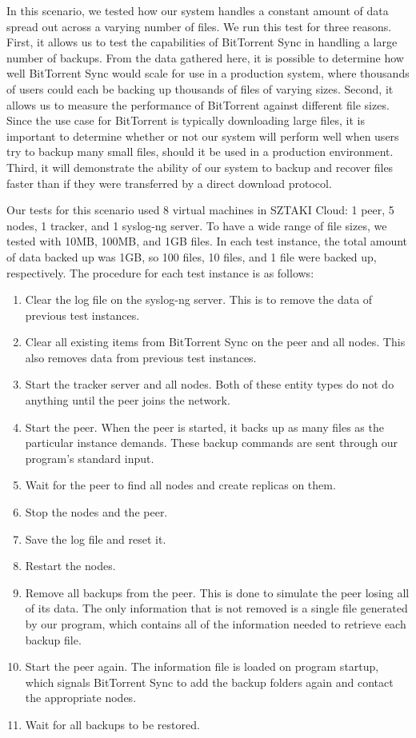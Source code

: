 \documentclass[12pt]{report}
\begin{document}
In this scenario, we tested how our system handles a constant amount of data spread out across a varying number of files. We run this test for three reasons. First, it allows us to test the capabilities of BitTorrent Sync in handling a large number of backups. From the data gathered here, it is possible to determine how well BitTorrent Sync would scale for use in a production system, where thousands of users could each be backing up thousands of files of varying sizes. Second, it allows us to measure the performance of BitTorrent against different file sizes. Since the use case for BitTorrent is typically downloading large files, it is important to determine whether or not our system will perform well when users try to backup many small files, should it be used in a production environment. Third, it will demonstrate the ability of our system to backup and recover files faster than if they were transferred by a direct download protocol.

Our tests for this scenario used 8 virtual machines in SZTAKI Cloud: 1 peer, 5 nodes, 1 tracker, and 1 syslog-ng server. To have a wide range of file sizes, we tested with 10MB, 100MB, and 1GB files. In each test instance, the total amount of data backed up was 1GB, so 100 files, 10 files, and 1 file were backed up, respectively. The procedure for each test instance is as follows:

\begin{enumerate}
  \item Clear the log file on the syslog-ng server. This is to remove the data of previous test instances.
  \item Clear all existing items from BitTorrent Sync on the peer and all nodes. This also removes data from previous test instances.
  \item Start the tracker server and all nodes. Both of these entity types do not do anything until the peer joins the network.
  \item Start the peer. When the peer is started, it backs up as many files as the particular instance demands. These backup commands are sent through our program's standard input.
  \item Wait for the peer to find all nodes and create replicas on them.
  \item Stop the nodes and the peer.
  \item Save the log file and reset it.
  \item Restart the nodes.
  \item Remove all backups from the peer. This is done to simulate the peer losing all of its data. The only information that is not removed is a single file generated by our program, which contains all of the information needed to retrieve each backup file.
  \item Start the peer again. The information file is loaded on program startup, which signals BitTorrent Sync to add the backup folders again and contact the appropriate nodes.
  \item Wait for all backups to be restored.
\end{enumerate}
\end{document}
